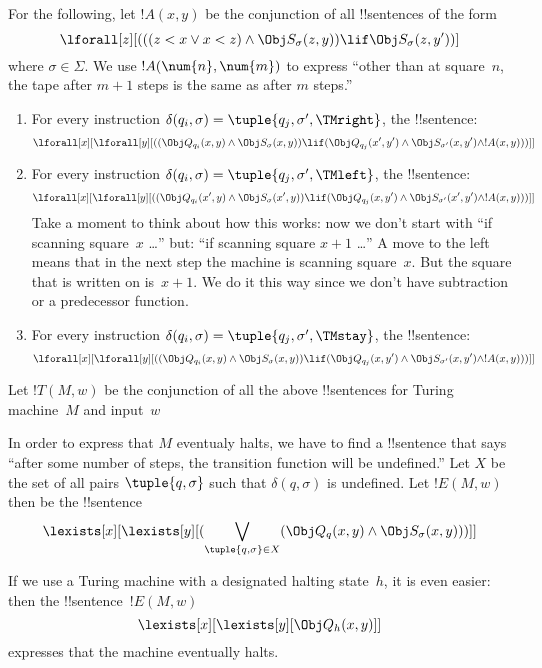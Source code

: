 \documentclass[../../../include/open-logic-section]{subfiles}
\begin{document}
\begin{enumerate}
For the following, let $!A(x, y)$ be the conjunction of all !!{sentence}s
of the form
\[
\lforall[z][
  (((z < x \lor x < z) \land \Obj S_\sigma(z, y))
  \lif \Obj S_\sigma(z, y'))]
\]
where $\sigma \in \Sigma$.  We use $!A(\num{n},\num{m})$ to express
``other than at square~$n$, the tape after $m+1$ steps is the same as
after $m$ steps.''
\begin{enumerate}
\item {} For every instruction $\delta(q_i, \sigma) =
  \tuple{q_j, \sigma', \TMright}$, the !!{sentence}:
\[
\lforall[x][\lforall[y][(
   (\Obj Q_{q_i}(x, y) \land \Obj S_{\sigma}(x, y)) \lif
   (\Obj Q_{q_j}(x', y') \land \Obj S_{\sigma'}(x, y') \land
!A(x, y)))]]
\]
\item {} For every instruction $\delta(q_i, \sigma) =
  \tuple{q_j, \sigma', \TMleft}$, the !!{sentence}:
\[
\lforall[x][\lforall[y][
    ((\Obj Q_{q_i}(x', y) \land \Obj S_{\sigma}(x', y)) \lif
   (\Obj Q_{q_j}(x, y') \land \Obj S_{\sigma'}(x', y') \land
!A(x, y)))]]
\]
Take a moment to think about how this works: now we don't start with
``if scanning square~$x$ \dots'' but: ``if scanning square $x+1$
\dots'' A move to the left means that in the next step the machine is
scanning square~$x$.  But the square that is written on is~$x+1$.  We
do it this way since we don't have subtraction or a predecessor
function.
\item {} For every instruction $\delta(q_i, \sigma) =
  \tuple{q_j, \sigma', \TMstay}$, the !!{sentence}:
\[
\lforall[x][\lforall[y][(
   (\Obj Q_{q_i}(x, y) \land \Obj S_{\sigma}(x, y)) \lif
   (\Obj Q_{q_j}(x, y') \land \Obj S_{\sigma'}(x, y') \land
!A(x, y)))]]
\]
\end{enumerate}
\end{enumerate}
Let $!T(M, w)$ be the conjunction of all the above !!{sentence}s for Turing
machine~$M$ and input~$w$

In order to express that $M$ eventualy halts, we have to find a
!!{sentence} that says ``after some number of steps, the transition
function will be undefined.''  Let $X$ be the set of all pairs
$\tuple{q, \sigma}$ such that $\delta(q, \sigma)$ is undefined.  Let
$!E(M, w)$ then be the !!{sentence}
\[
\lexists[x][\lexists[y][(\bigvee_{\tuple{q, \sigma} \in
      X}(\Obj Q_q(x, y) \land \Obj S_\sigma(x, y)))]]
\]

If we use a Turing machine with a designated halting state~$h$, it
is even easier: then the !!{sentence}~$!E(M, w)$
\[
\lexists[x][\lexists[y][\Obj Q_h(x, y)]]
\]
expresses that the machine eventually halts.
\end{document}
